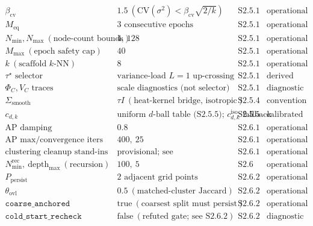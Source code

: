 \documentclass[11pt]{article}
\begin{document}
\[\begin{array}{llll}
\beta_{\mathrm{cv}} & 1.5\ (\mathrm{CV}(\sigma^2)<\beta_{\mathrm{cv}}\sqrt{2/k}) & \text{S2.5.1} & \text{operational}\\
M_{\mathrm{eq}} & 3\text{ consecutive epochs} & \text{S2.5.1} & \text{operational}\\
N_{\min},N_{\max}\ (\text{node-count bounds}) & 4,\ 128 & \text{S2.5.1} & \text{operational}\\
M_{\max}\ (\text{epoch safety cap}) & 40 & \text{S2.5.1} & \text{operational}\\
k\ (\text{scaffold }k\text{-NN}) & 8 & \text{S2.5.1} & \text{operational}\\
\tau^\star\text{ selector} & \text{variance-load }L=1\text{ up-crossing} & \text{S2.5.1} & \text{derived}\\
\Phi_C,V_C\text{ traces} & \text{scale diagnostics (not selector)} & \text{S2.5.1} & \text{diagnostic}\\
\Sigma_{\mathrm{smooth}} & \tau I\ (\text{heat-kernel bridge, isotropic}) & \text{S2.5.4} & \text{convention}\\
c_{d,k} & \text{uniform }d\text{-ball table (S2.5.5); } c_{d,k}^{\mathrm{iso}}\text{ fallback} & \text{S2.5.5} & \text{calibrated}\\
\text{AP damping} & 0.8 & \text{S2.6.1} & \text{operational}\\
\text{AP max/convergence iters} & 400,\ 25 & \text{S2.6.1} & \text{operational}\\
\text{clustering cleanup stand-ins} & \text{provisional; see OPEN\_ISSUES \#27} & \text{S2.6.1} & \text{operational}\\
N_{\min}^{\mathrm{rec}},\ \mathrm{depth}_{\max}\ (\text{recursion}) & 100,\ 5 & \text{S2.6} & \text{operational}\\
P_{\mathrm{persist}} & 2\text{ adjacent grid points} & \text{S2.6.2} & \text{operational}\\
\theta_{\mathrm{ovl}} & 0.5\ (\text{matched-cluster Jaccard}) & \text{S2.6.2} & \text{operational}\\
\texttt{coarse\_anchored} & \text{true}\ (\text{coarsest split must persist}) & \text{S2.6.2} & \text{operational}\\
\texttt{cold\_start\_recheck} & \text{false}\ (\text{refuted gate; see S2.6.2}) & \text{S2.6.2} & \text{diagnostic}\\

\end{array}\]
\end{document}
